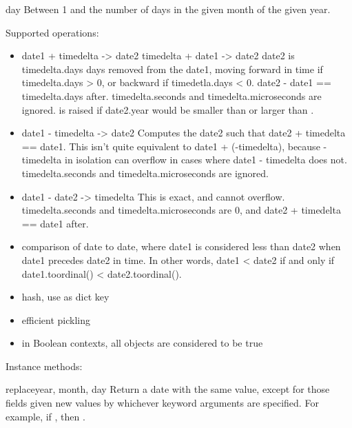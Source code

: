 \begin{memberdesc}{day}
Between 1 and the number of days in the given month
                    of the given year.
\end{memberdesc}

Supported operations:

\begin{itemize}
  \item
    date1 + timedelta -> date2
    timedelta + date1 -> date2
    date2 is timedelta.days days removed from the date1, moving forward
    in time if timedelta.days > 0, or backward if timedetla.days < 0.
    date2 - date1 == timedelta.days after.  timedelta.seconds and
    timedelta.microseconds are ignored.   is
    raised if date2.year would be smaller than  or
    larger than .

  \item
    date1 - timedelta -> date2
    Computes the date2 such that date2 + timedelta == date1.  This
    isn't quite equivalent to date1 + (-timedelta), because -timedelta
    in isolation can overflow in cases where date1 - timedelta does
    not.  timedelta.seconds and timedelta.microseconds are ignored.

  \item
    date1 - date2 -> timedelta
    This is exact, and cannot overflow.  timedelta.seconds and
    timedelta.microseconds are 0, and date2 + timedelta == date1
    after.

  \item
    comparison of date to date, where date1 is considered less than
    date2 when date1 precedes date2 in time.  In other words,
    date1 < date2 if and only if date1.toordinal() < date2.toordinal().

  \item
    hash, use as dict key

  \item
    efficient pickling

  \item
    in Boolean contexts, all  objects are considered to be true
\end{itemize}

Instance methods:

\begin{methoddesc}{replace}{year, month, day}
    Return a date with the same value, except for those fields given
    new values by whichever keyword arguments are specified.  For
    example, if , then
    .
\end{methoddesc}

